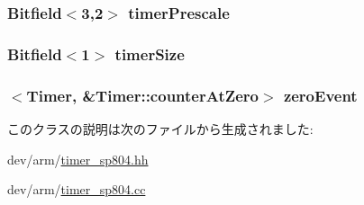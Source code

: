 \label{classSp804_1_1Timer_aa71cecfa28f348244319827543df9e18}
\hypertarget{classSp804_1_1Timer_afd859e1d86a57cb7711f17ab63ad4646}{
\subsubsection[{timerPrescale}]{\setlength{\rightskip}{0pt plus 5cm}Bitfield$<$3,2$>$ {\bf timerPrescale}}}
\label{classSp804_1_1Timer_afd859e1d86a57cb7711f17ab63ad4646}
\hypertarget{classSp804_1_1Timer_a3952efcfdef8f7aa15b0ebcdbbe4bdd3}{
\subsubsection[{timerSize}]{\setlength{\rightskip}{0pt plus 5cm}Bitfield$<$1$>$ {\bf timerSize}}}
\label{classSp804_1_1Timer_a3952efcfdef8f7aa15b0ebcdbbe4bdd3}
\hypertarget{classSp804_1_1Timer_adc49d182c815493be0b95fda604da5da}{
\subsubsection[{zeroEvent}]{$<${\bf Timer}, \&Timer::counterAtZero$>$ {\bf zeroEvent}}}
\label{classSp804_1_1Timer_adc49d182c815493be0b95fda604da5da}


このクラスの説明は次のファイルから生成されました:\begin{DoxyCompactItemize}
\item 
dev/arm/\hyperlink{timer__sp804_8hh}{timer\_\-sp804.hh}\item 
dev/arm/\hyperlink{timer__sp804_8cc}{timer\_\-sp804.cc}\end{DoxyCompactItemize}
